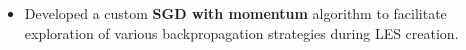 \documentclass[10pt,a4paper,ragged2e,withhyper]{altacv}
\begin{document}
\begin{paracol}{2}
\begin{itemize}
        \item Developed a custom \textbf{SGD with momentum} algorithm to facilitate exploration of various backpropagation strategies during LES creation.


    \end{itemize}













\end{paracol}
\end{document}
